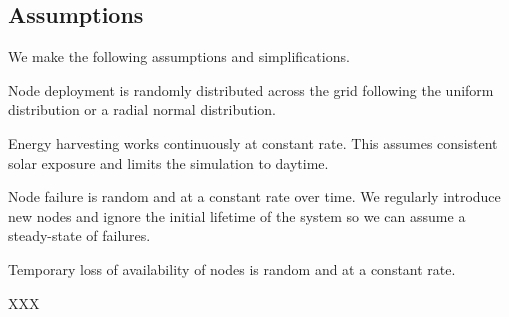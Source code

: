 	\subsection{Assumptions}
	We make the following assumptions and simplifications.
	\begin{itemize}{
			\item Node deployment is randomly distributed across the grid following the uniform distribution or a radial normal distribution.
			\item Energy harvesting works continuously at constant rate. This assumes consistent solar exposure and limits the simulation to daytime.
			\item Node failure is random and at a constant rate over time. We regularly introduce new nodes and ignore the initial lifetime of the system so we can assume a steady-state of failures.
			\item Temporary loss of availability of nodes is random and at a constant rate.
			
		}
	\end{itemize}
	
	
	
	
	\begin{definition}[Energy]
		XXX
	\end{definition}
	
	